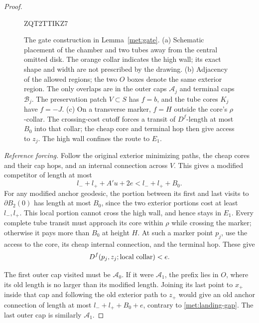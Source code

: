 \documentclass[11pt]{article}
\numberwithin{equation}{section}
\theoremstyle{definition}
\theoremstyle{remark}
\newcommand{\1}{\mathbf 1}
\begin{document}
\begin{proof}
\begin{figure}[htbp]
\par 

ZQT2TTIKZ7
\endgroup

\caption{The gate construction in Lemma~\ref{met:gate}.
(a) Schematic placement of the chamber and two tubes away from the
central omitted disk.  The orange collar indicates the high wall;
its exact shape and width are not prescribed by the drawing.
(b) Adjacency of the allowed regions; the two $O$ boxes denote the same
exterior region.  The only overlaps are in the outer caps $\mathcal A_j$
and terminal caps $\mathcal B_j$.  The preservation patch $V\subset S$
has $f=b$, and the tube cores $K_j$ have $f=-J$.
(c) On a transverse marker, $f=H$ outside the core's $\rho$-collar.
The crossing-cost cutoff forces a transit of $D^f$-length at most $B_0$
into that collar; the cheap core and terminal hop then give access to
$z_j$.  The high wall confines the route to $E_1$.}
\label{met:gate-figure}
\end{figure}

\emph{Reference forcing.}
Follow the original exterior minimizing paths, the cheap cores and
their cap hops, and an internal connection across $V$.  This gives a
modified competitor of length at most
\begin{equation}
 l_-+l_++A'u+2e<l_-+l_++B_0.
 \label{met:gate-budget}
\end{equation}
For any modified anchor geodesic, the portion between its first and
last visits to $\partial B_2(0)$ has length at most $B_0$, since the
two exterior portions cost at least $l_-,l_+$.  This local portion
cannot cross the high wall, and hence stays in $E_1$.  Every complete
tube transit must approach its core within $\rho$ while crossing the
marker; otherwise it pays more than $B_0$ at height $H$.
At such a marker point $p_j$, use the access to the core, its cheap
internal connection, and the terminal hop.  These give
\begin{equation}
 D^f(p_j,z_j;\hbox{local collar})<e.
 \label{met:gate-access}
\end{equation}

The first outer cap visited must be $\mathcal A_0$.  If it were
$\mathcal A_1$, the prefix lies in $O$, where its old length is no
larger than its modified length.  Joining its last point to $x_+$
inside that cap and following the old exterior path to $z_+$ would
give an old anchor connection of length at most
$l_-+l_++B_0+e$, contrary to \eqref{met:landing-gap}.
The last outer cap is similarly $\mathcal A_1$.


\end{proof}
\end{document}

